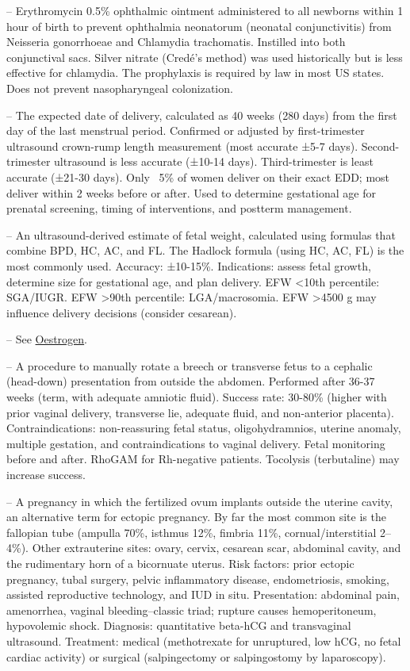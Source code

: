 -- Erythromycin 0.5\% ophthalmic ointment administered to all newborns within 1 hour of birth to prevent ophthalmia neonatorum (neonatal conjunctivitis) from Neisseria gonorrhoeae and Chlamydia trachomatis. Instilled into both conjunctival sacs. Silver nitrate (Credé's method) was used historically but is less effective for chlamydia. The prophylaxis is required by law in most US states. Does not prevent nasopharyngeal colonization.

-- The expected date of delivery, calculated as 40 weeks (280 days) from the first day of the last menstrual period. Confirmed or adjusted by first-trimester ultrasound crown-rump length measurement (most accurate ±5-7 days). Second-trimester ultrasound is less accurate (±10-14 days). Third-trimester is least accurate (±21-30 days). Only ~5\% of women deliver on their exact EDD; most deliver within 2 weeks before or after. Used to determine gestational age for prenatal screening, timing of interventions, and postterm management.

-- An ultrasound-derived estimate of fetal weight, calculated using formulas that combine BPD, HC, AC, and FL. The Hadlock formula (using HC, AC, FL) is the most commonly used. Accuracy: ±10-15\%. Indications: assess fetal growth, determine size for gestational age, and plan delivery. EFW <10th percentile: SGA/IUGR. EFW >90th percentile: LGA/macrosomia. EFW >4500 g may influence delivery decisions (consider cesarean).

-- See \hyperlink{Oestrogen}{Oestrogen}.

-- A procedure to manually rotate a breech or transverse fetus to a cephalic (head-down) presentation from outside the abdomen. Performed after 36-37 weeks (term, with adequate amniotic fluid). Success rate: 30-80\% (higher with prior vaginal delivery, transverse lie, adequate fluid, and non-anterior placenta). Contraindications: non-reassuring fetal status, oligohydramnios, uterine anomaly, multiple gestation, and contraindications to vaginal delivery. Fetal monitoring before and after. RhoGAM for Rh-negative patients. Tocolysis (terbutaline) may increase success.

-- A pregnancy in which the fertilized ovum implants outside the uterine cavity, an alternative term for ectopic pregnancy. By far the most common site is the fallopian tube (ampulla 70\%, isthmus 12\%, fimbria 11\%, cornual/interstitial 2--4\%). Other extrauterine sites: ovary, cervix, cesarean scar, abdominal cavity, and the rudimentary horn of a bicornuate uterus. Risk factors: prior ectopic pregnancy, tubal surgery, pelvic inflammatory disease, endometriosis, smoking, assisted reproductive technology, and IUD in situ. Presentation: abdominal pain, amenorrhea, vaginal bleeding--classic triad; rupture causes hemoperitoneum, hypovolemic shock. Diagnosis: quantitative beta-hCG and transvaginal ultrasound. Treatment: medical (methotrexate for unruptured, low hCG, no fetal cardiac activity) or surgical (salpingectomy or salpingostomy by laparoscopy).

